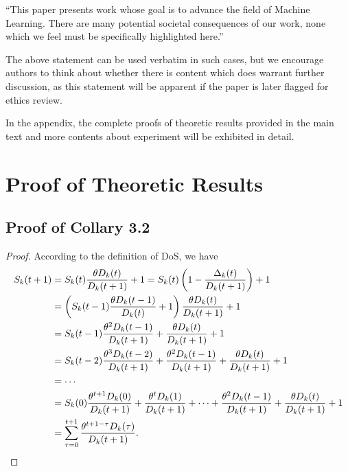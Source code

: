 \documentclass{article}
\theoremstyle{plain}
\theoremstyle{definition}
\theoremstyle{remark}
\begin{document}
``This paper presents work whose goal is to advance the field of 
Machine Learning. There are many potential societal consequences 
of our work, none which we feel must be specifically highlighted here.''

The above statement can be used verbatim in such cases, but we 
encourage authors to think about whether there is content which does 
warrant further discussion, as this statement will be apparent if the 
paper is later flagged for ethics review.


\nocite{langley00}





\newpage
\appendix
\onecolumn
In the appendix, the complete proofs of theoretic results provided in the main text and more contents about experiment will be exhibited in detail.
\section{Proof of Theoretic Results}
\subsection{Proof of Collary 3.2}
\begin{proof}
    According to the definition of DoS, we have
    \begin{align}
      S_k(t+1) & = S_k(t) \frac{\theta D_k(t)}{D_k(t+1)} + 1 = S_k(t)\left(1 - \frac{\Delta_k(t)}{D_k(t+1)}\right) + 1 \notag \\
               & = \left(S_k(t-1) \frac{\theta D_k(t-1)}{D_k(t)} + 1\right) \frac{\theta D_k(t)}{D_k(t+1)} + 1 \notag \\
               & = S_k(t-1) \frac{\theta^2 D_k(t-1)}{D_k(t+1)} + \frac{\theta D_k(t)}{D_k(t+1)} + 1 \notag \\
               & = S_k(t-2) \frac{\theta^3 D_k(t-2)}{D_k(t+1)} + \frac{\theta^2 D_k(t-1)}{D_k(t+1)} + \frac{\theta D_k(t)}{D_k(t+1)} + 1 \notag \\
               & = \cdots \notag \\
               & = S_k(0) \frac{\theta^{t+1} D_k(0)}{D_k(t+1)} + \frac{\theta^t D_k(1)}{D_k(t+1)} + \cdots + \frac{\theta^2 D_k(t-1)}{D_k(t+1)} + \frac{\theta D_k(t)}{D_k(t+1)} + 1 \notag \\
               & = \sum_{\tau = 0}^{t+1} \frac{\theta^{t+1-\tau} D_k(\tau)}{D_k(t+1)}.
    \end{align}
  \end{proof}
\end{document}
